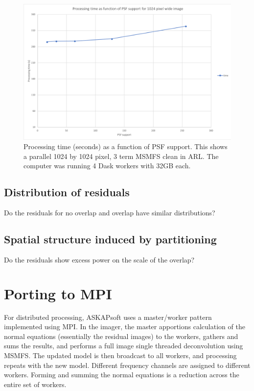 \documentclass[11pt,a4paper,variablewidth]{article}
\begin{document}
\begin{figure}[H]
  \centering
  \includegraphics[width=\textwidth]{./time_versus_support}
  \caption{Processing time (seconds) as a function of PSF support. This shows  a parallel 1024 by 1024 pixel, 3 term MSMFS clean in ARL. The computer was running 4 Dask workers with 32GB each.}
  \label{fig:time_vs_support}
\end{figure}


\subsection{Distribution of residuals}

Do the residuals for no overlap and overlap have similar distributions?

\subsection{Spatial structure induced by partitioning}

Do the residuals show excess power on the scale of the overlap?

\pagebreak
\section{Porting to MPI}

For distributed processing, ASKAPsoft uses a master/worker pattern implemented using MPI. In the imager, the master apportions calculation of the normal equations (essentially the residual images) to the workers, gathers and sums the results, and performs a full image single threaded deconvolution using MSMFS. The updated model is then broadcast to all workers, and processing repeats with the new model. Different frequency channels are assigned to different workers. Forming and summing the normal equations is a reduction across the entire set of workers.
\end{document}
